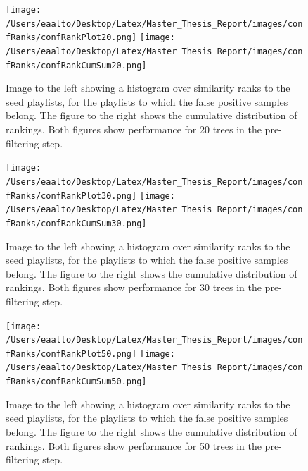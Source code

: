 \documentclass[a4paper,11pt]{kth-mag}
\begin{document}
\begin{figure}
\centering
\texttt{[image: /Users/eaalto/Desktop/Latex/Master\_Thesis\_Report/images/confRanks/confRankPlot20.png]}
\texttt{[image: /Users/eaalto/Desktop/Latex/Master\_Thesis\_Report/images/confRanks/confRankCumSum20.png]}

\caption{Image to the left showing a histogram over similarity ranks to the seed playlists, for the playlists to which the false positive samples belong. The figure to the right shows the cumulative distribution of rankings. Both figures show performance for 20 trees in the pre-filtering step.}
\end{figure}

\begin{figure}
\centering
\texttt{[image: /Users/eaalto/Desktop/Latex/Master\_Thesis\_Report/images/confRanks/confRankPlot30.png]}
\texttt{[image: /Users/eaalto/Desktop/Latex/Master\_Thesis\_Report/images/confRanks/confRankCumSum30.png]}

\caption{Image to the left showing a histogram over similarity ranks to the seed playlists, for the playlists to which the false positive samples belong. The figure to the right shows the cumulative distribution of rankings. Both figures show performance for 30 trees in the pre-filtering step.}
\end{figure}

\begin{figure}
\centering
\texttt{[image: /Users/eaalto/Desktop/Latex/Master\_Thesis\_Report/images/confRanks/confRankPlot50.png]}
\texttt{[image: /Users/eaalto/Desktop/Latex/Master\_Thesis\_Report/images/confRanks/confRankCumSum50.png]}

\caption{Image to the left showing a histogram over similarity ranks to the seed playlists, for the playlists to which the false positive samples belong. The figure to the right shows the cumulative distribution of rankings. Both figures show performance for 50 trees in the pre-filtering step.}
\end{figure}
\end{document}
